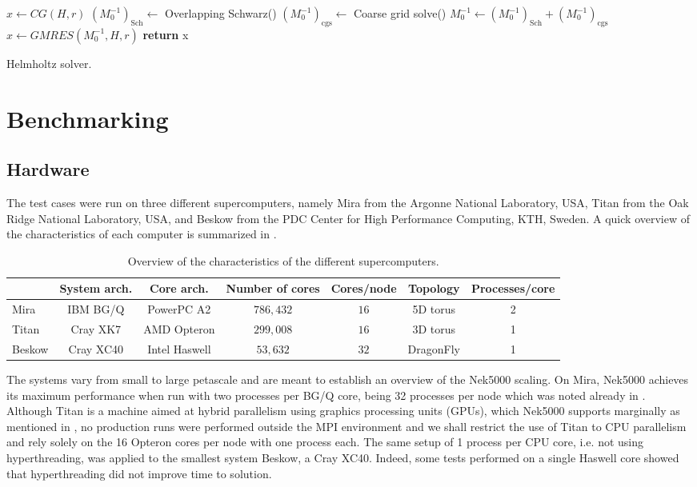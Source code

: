 \documentclass{sig-alternate}
\begin{document}
\begin{algorithm}
\begin{algorithmic}
\State $x \leftarrow CG(H, r)$
\State $\left(M_0^{-1}\right)_{\text{Sch}} \leftarrow$ Overlapping Schwarz()
\State $\left(M_0^{-1}\right)_{\text{cgs}} \leftarrow$ Coarse grid solve() %
\State $M_0^{-1} \leftarrow \left(M_0^{-1}\right)_{\text{Sch}} + \left(M_0^{-1}\right)_{\text{cgs}}$
\State $x \leftarrow GMRES(M_0^{-1}, H, r)$
\EndIf
\State \textbf{return} x
\EndProcedure
\end{algorithmic}
\caption{Helmholtz solver.}
\label{alg:helmholtz}
\end{algorithm}

\section{Benchmarking}
\label{sec:benchmarking}

\subsection{Hardware}
\label{sec:hardware}

The test cases were run on three different supercomputers, namely Mira from the
Argonne National Laboratory, USA, Titan from the Oak Ridge National Laboratory,
USA, and Beskow from the PDC Center for High Performance Computing, KTH, Sweden.
A quick overview of the characteristics of each computer is summarized in 
.
\begin{table}
\centering
\caption{Overview of the characteristics of the different supercomputers.}
\begin{tabular}{l|cccccc} 
\hline
 & System arch. & Core arch. & Number of cores & Cores/node & Topology & Processes/core \\
 \hline
Mira   & IBM BG/Q & PowerPC A2 & $786,432$ & $16$ & 5D torus  &2\\ 
Titan  & Cray XK7 & AMD Opteron & $299,008$ & $16$ & 3D torus  &1\\ 
Beskow & Cray XC40 & Intel Haswell & $53,632$  & $32$ & DragonFly &1\\
\hline
\end{tabular}
\label{tab:computer_charac}
\end{table}
The systems vary from small to large petascale and are meant to establish an overview of the Nek5000 scaling. On Mira, Nek5000 achieves its
maximum performance when run with two processes per BG/Q core, being 32 processes
per node which was noted already in \cite{fischer:scaling}. Although Titan is a
machine aimed at hybrid parallelism using graphics processing units (GPUs), which
Nek5000 supports marginally as mentioned in \cite{Otten2016}, no production runs
were performed outside the MPI environment and we shall restrict the use of
Titan to CPU parallelism and rely solely
on the 16 Opteron cores per node with one process each. The same setup of 1
process per CPU core, i.e. not using hyperthreading, was applied to the smallest 
system Beskow, a Cray XC40. Indeed, some tests performed on a single Haswell core 
showed that hyperthreading did not improve time to solution.
\end{document}
